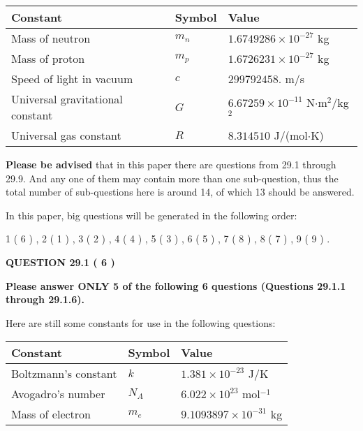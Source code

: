 \documentclass[12pt]{article}
\begin{document}
 
\noindent\begin{tabular}{|l|l|l|}
\hline
Constant & Symbol & Value \\
\hline
Mass of neutron &
$m_n$ &
 $ 1.6749286 \times 10^{-27} $
kg \\
\hline
Mass of proton &
$m_p$ &
 $ 1.6726231 \times 10^{-27} $
kg \\
\hline
Speed of light in vacuum &
$c$ &
 $ 299792458. $
m/s \\
\hline
Universal gravitational constant &
$G$ &
 $ 6.67259 \times 10^{-11} $
N$\cdot $m$^2$/kg$^2$ \\
\hline
Universal gas constant &
$R$ &
 $ 8.314510 $
J/(mol$\cdot $K) \\
\hline
\end{tabular}
 
 
{\textbf{\large{Please be advised}}} that in this paper there are questions from
29.1 through
29.9.
And any one of them may contain more than one sub-question, thus the total number
of sub-questions here is around 14, of which
13 should be answered.
 
\vspace{0.3in}
 
 
   
   
   
\vspace{0.2in}
   
In this paper, big questions will be generated in the following order: 
   
   
             1 (           6 )
 ,
             2 (           1 )
 ,
             3 (           2 )
 ,
             4 (           4 )
 ,
             5 (           3 )
 ,
             6 (           5 )
 ,
             7 (           8 )
 ,
             8 (           7 )
 ,
             9 (           9 )
 .
  
\vspace{0.2in}
  
{\textbf{\Large{QUESTION
29.1 
 (           6 )
}}}
  
  
 
{\textbf{\Large{Please answer ONLY
5 of the following
6 questions (Questions
29.1.1 through
29.1.6). }}}
 
Here are still some constants for use in the following questions:
 
 
\noindent\begin{tabular}{|l|l|l|}
\hline
Constant & Symbol & Value \\
\hline
 
Boltzmann's constant &
$k$ &
 $ 1.381 \times 10^{-23} $
J/K \\
\hline
 
Avogadro's number &
$N_A$ &
 $ 6.022 \times 10^{23} $
mol$^{-1}$ \\
\hline
 
Mass of electron &
$m_e$ &
 $ 9.1093897 \times 10^{-31} $
kg \\
\hline
 
\end{tabular}
 
\end{document}
